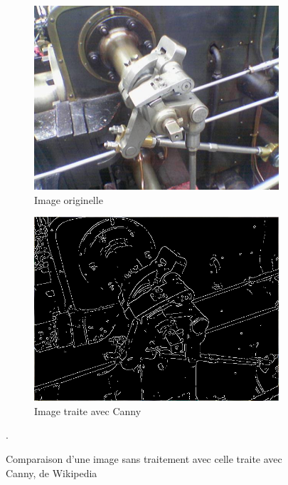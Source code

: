 \documentclass[a4paper, 12pt, titlepage, oneside, french]{article}
\begin{document}
	\begin{figure}[] %
		\centering
		\begin{subfigure}[b]{0.4\linewidth}%
			\includegraphics[width=\linewidth]{ValveOriginal.png}
			\caption{Image originelle}
		\end{subfigure}
		\begin{subfigure}[b]{0.4\linewidth}
			\includegraphics[width=\linewidth]{ValveCanny.png}
			\caption{Image traite avec Canny}
		\end{subfigure}
		\caption{Comparaison d'une image sans traitement avec celle traite avec Canny, de Wikipedia \cite{WikiCannyOriginal}\cite{WikiCanny}}. 
		\label{fig:cannyGood}
	\end{figure}
\end{document}
